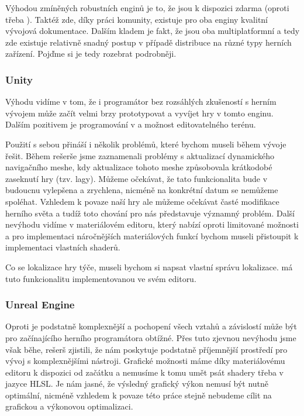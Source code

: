 Výhodou zmíněných robustních enginů je to, že jsou k dispozici zdarma (oproti třeba \CRY{}). Taktéž zde, díky práci komunity, existuje pro oba enginy  kvalitní vývojová dokumentace. Dalším kladem je fakt, že jsou oba multiplatformní a tedy zde existuje relativně snadný postup v případě distribuce na různé typy herních zařízení. Pojďme si je tedy rozebrat podrobněji.

\subsubsection{Unity}
Výhodu \UN{} vidíme v tom, že i programátor bez rozsáhlých zkušeností s herním vývojem může začít velmi brzy prototypovat a vyvíjet hry v tomto enginu. Dalším pozitivem je programování v \CS{} a možnost editovatelného terénu.

Použití \UN{} s sebou přináší i několik problémů, které bychom museli během vývoje řešit. Během rešerše jsme zaznamenali problémy s aktualizací dynamického navigačního meshe, kdy aktualizace tohoto meshe způsobovala krátkodobé zaseknutí hry (tzv. lagy). Můžeme očekávat, že tato funkcionalita bude v budoucnu vylepšena a zrychlena, nicméně na konkrétní datum se nemůžeme spoléhat. Vzhledem k povaze naší hry ale můžeme očekávat časté modifikace herního světa a tudíž toto chování pro nás představuje významný problém. Další nevýhodu vidíme v materiálovém editoru, který nabízí oproti \UE{} limitované možnosti a pro implementaci náročnějších materiálových funkcí bychom museli přistoupit k implementaci vlastních shaderů.

Co se lokalizace hry týče, museli bychom si napsat vlastní správu lokalizace\citep{unity_loc}. \UE{} má tuto funkcionalitu implementovanou ve svém editoru\citep{ue_loc}.


\subsubsection{Unreal Engine}
Oproti \UN{} je \UE{} podstatně komplexnější a pochopení všech vztahů a závislostí může být pro začínajícího herního programátora obtížné. Přes tuto zjevnou nevýhodu jsme však běhe, rešerš zjistili, že \UE{} nám poskytuje podstatně příjemnější prostředí pro vývoj s komplexnějšími nástroji. Grafické možnosti máme díky materiálovému editoru k dispozici od začátku a nemusíme k tomu umět psát shadery třeba v jazyce HLSL. Je nám jasné, že výsledný grafický výkon nemusí být nutně optimální, nicméně vzhledem k povaze této práce stejně nebudeme cílit na grafickou a výkonovou optimalizaci.

